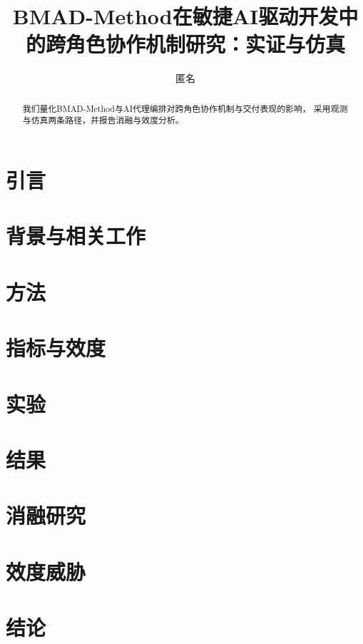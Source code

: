 \documentclass[UTF8]{ctexart}
\title{BMAD-Method在敏捷AI驱动开发中的跨角色协作机制研究：实证与仿真}
\author{匿名}
\date{}
\begin{document}
\maketitle

\begin{abstract}
我们量化BMAD-Method与AI代理编排对跨角色协作机制与交付表现的影响，
采用观测与仿真两条路径，并报告消融与效度分析。
\end{abstract}

\section{引言}

\section{背景与相关工作}

\section{方法}

\section{指标与效度}

\section{实验}

\section{结果}

\section{消融研究}

\section{效度威胁}

\section{结论}



\end{document}
